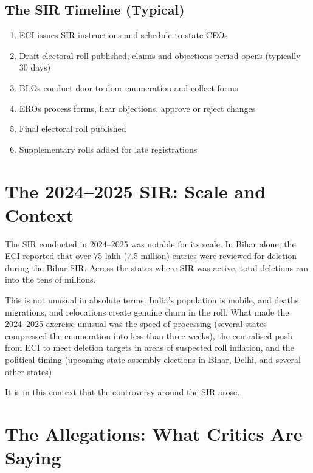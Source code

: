 \documentclass[11pt, a4paper]{article}
\begin{document}
\subsection{The SIR Timeline (Typical)}

\begin{enumerate}[leftmargin=1.5em, itemsep=3pt]
  \item ECI issues SIR instructions and schedule to state CEOs
  \item Draft electoral roll published; claims and objections period opens (typically 30 days)
  \item BLOs conduct door-to-door enumeration and collect forms
  \item EROs process forms, hear objections, approve or reject changes
  \item Final electoral roll published
  \item Supplementary rolls added for late registrations
\end{enumerate}

\section{The 2024--2025 SIR: Scale and Context}

The SIR conducted in 2024--2025 was notable for its scale. In Bihar alone, the ECI reported that over 75 lakh (7.5 million) entries were reviewed for deletion during the Bihar SIR. Across the states where SIR was active, total deletions ran into the tens of millions.

This is not unusual in absolute terms: India's population is mobile, and deaths, migrations, and relocations create genuine churn in the roll. What made the 2024--2025 exercise unusual was the speed of processing (several states compressed the enumeration into less than three weeks), the centralised push from ECI to meet deletion targets in areas of suspected roll inflation, and the political timing (upcoming state assembly elections in Bihar, Delhi, and several other states).

It is in this context that the controversy around the SIR arose.

\newpage

\section{The Allegations: What Critics Are Saying}
\end{document}

